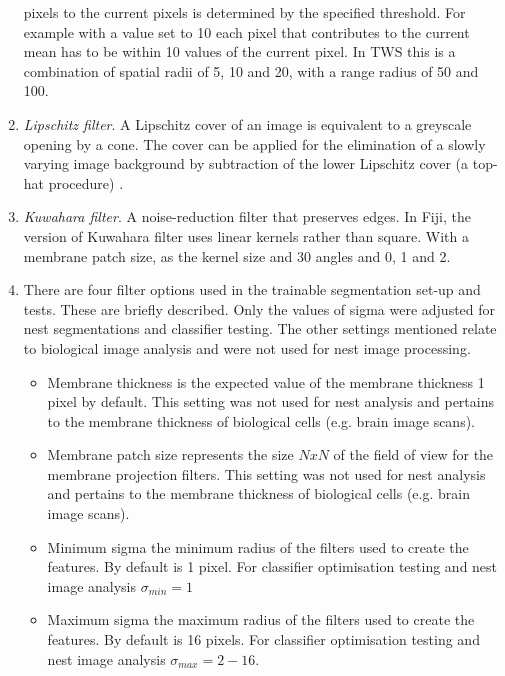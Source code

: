 \begin{enumerate}
pixels to the current pixels is determined by the specified threshold. For example with a value set to 10 each pixel that contributes to the current
mean has to be within 10 values of the current pixel. In \ac{TWS} this is a
combination of spatial radii of 5, 10 and 20, with a range radius of 50 and
100.
\item \emph{Lipschitz filter}. A Lipschitz cover of an image is equivalent to a
greyscale opening by a cone. The cover can be applied for the elimination of a slowly varying image background by subtraction of the lower Lipschitz cover (a top-hat procedure) \cite{Vstencel2006}. 
\item \emph{Kuwahara filter}. A noise-reduction filter that preserves edges. In \ac{Fiji}, the version of Kuwahara filter uses linear kernels rather than square. With a membrane patch size, as the kernel size and 30 angles and 0, 1 and 2.
\item There are four filter options used in the trainable segmentation set-up and tests. These are briefly described. Only the values of sigma were adjusted for nest segmentations and classifier testing. The other settings mentioned relate to biological image analysis and were not used for nest image processing.
\begin{itemize}
\item {Membrane thickness} is the expected value of the membrane thickness 1 pixel by default. This setting was not used for nest analysis and pertains to the membrane thickness of biological cells (e.g. brain image scans).
\item {Membrane patch size} represents the size $ NxN $ of the field of view for the membrane projection filters. This setting was not used for nest analysis and pertains to the membrane thickness of biological cells (e.g. brain image scans).
\item {Minimum sigma} the minimum radius of the filters used to create the features. By default is 1 pixel. For classifier optimisation testing and nest image analysis $\sigma_{min} = 1$
\item {Maximum sigma} the maximum radius of the filters used to create the features. By default is 16 pixels. For classifier optimisation testing and nest image analysis $\sigma_{max} = 2-16$.
\end{itemize}
\end{enumerate}

